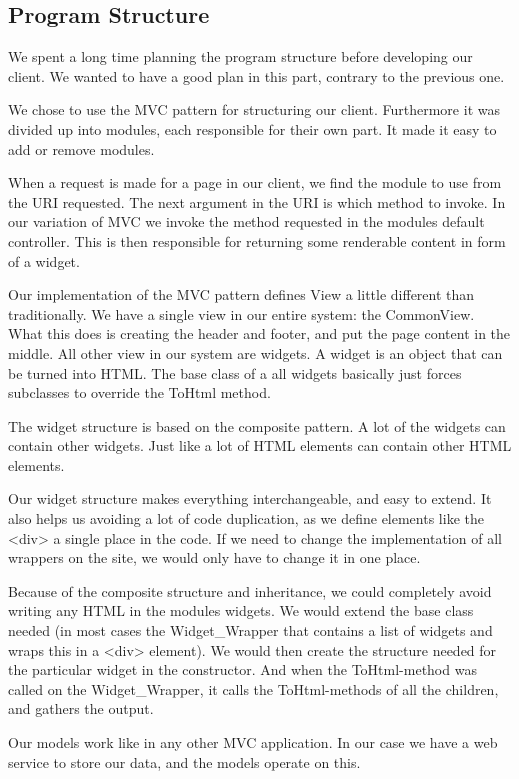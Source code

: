 \subsection{Program Structure}
We spent a long time planning the program structure before developing our client. We wanted to have a good plan in this part, contrary to the previous one.

We chose to use the MVC pattern for structuring our client. Furthermore it was divided up into modules, each responsible for their own part. It made it easy to add or remove modules.

When a request is made for a page in our client, we find the module to use from the URI requested. The next argument in the URI is which method to invoke. In our variation of MVC we invoke the method requested in the modules default controller. This is then responsible for returning some renderable content in form of a widget.

Our implementation of the MVC pattern defines View a little different than traditionally. We have a single view in our entire system: the CommonView. What this does is creating the header and footer, and put the page content in the middle. All other view in our system are widgets. A widget is an object that can be turned into HTML. The base class of a all widgets basically just forces subclasses to override the ToHtml method.

The widget structure is based on the composite pattern. A lot of the widgets can contain other widgets. Just like a lot of HTML elements can contain other HTML elements.

Our widget structure makes everything interchangeable, and easy to extend. It also helps us avoiding a lot of code duplication, as we define elements like the <div> a single place in the code. If we need to change the implementation of all wrappers on the site, we would only have to change it in one place.

Because of the composite structure and inheritance, we could completely avoid writing any HTML in the modules widgets. We would extend the base class needed (in most cases the Widget\_Wrapper that contains a list of widgets and wraps this in a <div> element). We would then create the structure needed for the particular widget in the constructor. And when the ToHtml-method was called on the Widget\_Wrapper, it calls the ToHtml-methods of all the children, and gathers the output. 

Our models work like in any other MVC application. In our case we have a web service to store our data, and the models operate on this.
	\newpage
